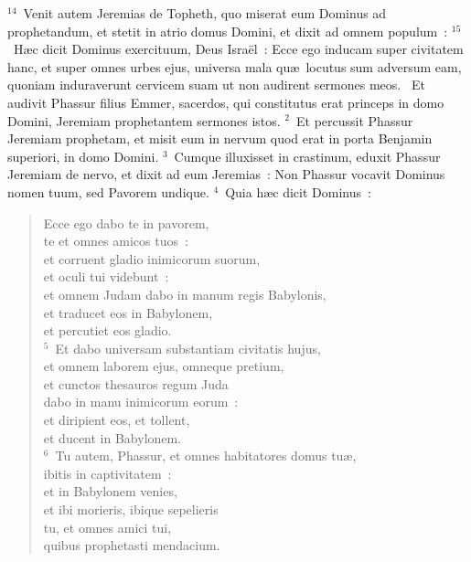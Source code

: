 ${}^{14}$~Venit autem Jeremias de Topheth, quo miserat eum Dominus ad prophetandum, et stetit in atrio domus Domini, et dixit ad omnem populum~:
${}^{15}$~H\ae c dicit Dominus exercituum, Deus Isra\"el~: Ecce ego inducam super civitatem hanc, et super omnes urbes ejus, universa mala qu\ae\ locutus sum adversum eam, quoniam induraverunt cervicem suam ut non audirent sermones meos.
~\lettrine[lines=10,image=true,loversize=0.05,lraise=-0.03]{E}{}t audivit Phassur filius Emmer, sacerdos, qui constitutus erat princeps in domo Domini, Jeremiam prophetantem sermones istos.
${}^{2}$~Et percussit Phassur Jeremiam prophetam, et misit eum in nervum quod erat in porta Benjamin superiori, in domo Domini.
${}^{3}$~Cumque illuxisset in crastinum, eduxit Phassur Jeremiam de nervo, et dixit ad eum Jeremias~: Non Phassur vocavit Dominus nomen tuum, sed Pavorem undique.
${}^{4}$~Quia h\ae c dicit Dominus~: \begin{flushleft}\begin{verse}Ecce ego dabo te in pavorem,\\ te et omnes amicos tuos~:\\ et corruent gladio inimicorum suorum,\\ et oculi tui videbunt~:\\ et omnem Judam dabo in manum regis Babylonis,\\ et traducet eos in Babylonem,\\ et percutiet eos gladio.\\
${}^{5}$~Et dabo universam substantiam civitatis hujus,\\ et omnem laborem ejus, omneque pretium,\\ et cunctos thesauros regum Juda\\ dabo in manu inimicorum eorum~:\\ et diripient eos, et tollent,\\ et ducent in Babylonem.\\
${}^{6}$~Tu autem, Phassur, et omnes habitatores domus tu\ae ,\\ ibitis in captivitatem~:\\ et in Babylonem venies,\\ et ibi morieris, ibique sepelieris\\ tu, et omnes amici tui,\\ quibus prophetasti mendacium.\end{verse}\end{flushleft}


